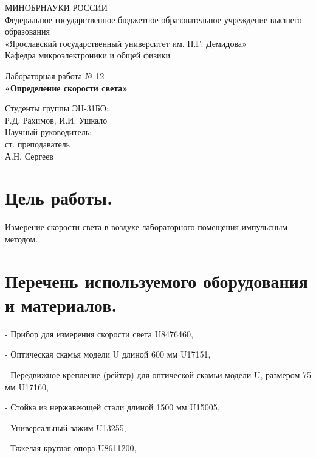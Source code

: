 \documentclass[12pt, a4paper]{article}
\begin{document}
	\onehalfspacing
	\thispagestyle{fancy}
	
	\begin{center}
		МИНОБРНАУКИ РОССИИ\\
		Федеральное государственное бюджетное образовательное учреждение высшего образования\\
		«Ярославский государственный университет им. П.Г. Демидова»\\[3mm]
		Кафедра микроэлектроники и общей физики
	\end{center}
	
	\vspace{55mm}
	
	\begin{center}
		Лабораторная работа № 12\\[3mm]
		\textbf{«Определение скорости света»}
	\end{center}
	
	\vspace{20mm}
	
	\begin{flushright}
		Студенты группы ЭН-31БО:\\
		Р.Д. Рахимов, И.И. Ушкало\\[5mm]
		Научный руководитель:\\
		ст. преподаватель\\
		А.Н. Сергеев
	\end{flushright}
	
	\newpage
	
	\section{Цель работы.}
	Измерение скорости света в воздухе лабораторного помещения импульсным методом.
	
	\section{Перечень используемого оборудования и материалов.}
	- Прибор для измерения скорости света U8476460,
	
	- Оптическая скамья модели U длиной 600 мм U17151,
	
	- Передвижное крепление (рейтер) для оптической скамьи модели U, размером 75 мм U17160,
	
	- Стойка из нержавеющей стали длиной 1500 мм U15005,
	
	- Универсальный зажим U13255,
	
	- Тяжелая круглая опора U8611200,
	
\end{document}
